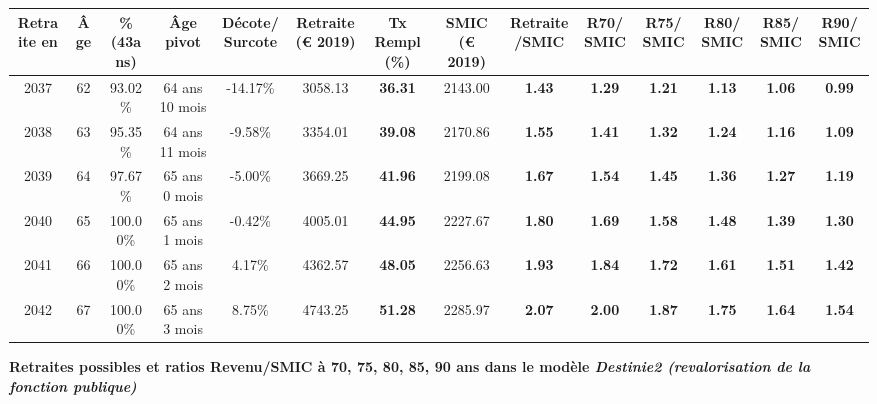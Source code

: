 \begin{adjustbox}{max width=\textwidth} 
\begin{tabular}[htb]{|c|c||c|c|c||c|c||c|c||c|c|c|c|c|} 
\hline 
 Retraite en &  Âge &  \%(43ans) &  Âge pivot &  Décote/Surcote &  Retraite (\euro{} 2019) &  Tx Rempl(\%) &  SMIC (\euro{} 2019) &  Retraite/SMIC &  R70/SMIC &  R75/SMIC &  R80/SMIC &  R85/SMIC &  R90/SMIC \\ 
\hline \hline 
 2037 &  62 &  93.02\% &  64 ans 10 mois &  -14.17\% &  3058.13 &  {\bf 36.31} &  2143.00 &  {\bf 1.43} &  {\bf 1.29} &  {\bf 1.21} &  {\bf 1.13} &  {\bf 1.06} &  {\bf {\color{red} 0.99}} \\ 
\hline 
 2038 &  63 &  95.35\% &  64 ans 11 mois &  -9.58\% &  3354.01 &  {\bf 39.08} &  2170.86 &  {\bf 1.55} &  {\bf 1.41} &  {\bf 1.32} &  {\bf 1.24} &  {\bf 1.16} &  {\bf 1.09} \\ 
\hline 
 2039 &  64 &  97.67\% &  65 ans 0 mois &  -5.00\% &  3669.25 &  {\bf 41.96} &  2199.08 &  {\bf 1.67} &  {\bf 1.54} &  {\bf 1.45} &  {\bf 1.36} &  {\bf 1.27} &  {\bf 1.19} \\ 
\hline 
 2040 &  65 &  100.00\% &  65 ans 1 mois &  -0.42\% &  4005.01 &  {\bf 44.95} &  2227.67 &  {\bf 1.80} &  {\bf 1.69} &  {\bf 1.58} &  {\bf 1.48} &  {\bf 1.39} &  {\bf 1.30} \\ 
\hline 
 2041 &  66 &  100.00\% &  65 ans 2 mois &  4.17\% &  4362.57 &  {\bf 48.05} &  2256.63 &  {\bf 1.93} &  {\bf 1.84} &  {\bf 1.72} &  {\bf 1.61} &  {\bf 1.51} &  {\bf 1.42} \\ 
\hline 
 2042 &  67 &  100.00\% &  65 ans 3 mois &  8.75\% &  4743.25 &  {\bf 51.28} &  2285.97 &  {\bf 2.07} &  {\bf 2.00} &  {\bf 1.87} &  {\bf 1.75} &  {\bf 1.64} &  {\bf 1.54} \\ 
\hline 
\hline 
\end{tabular} 
\end{adjustbox} 
 
 \vspace{0.1cm} 
{\bf \noindent Retraites possibles et ratios Revenu/SMIC à 70, 75, 80, 85, 90 ans dans le modèle \emph{Destinie2 (revalorisation de la fonction publique)}}  
 
